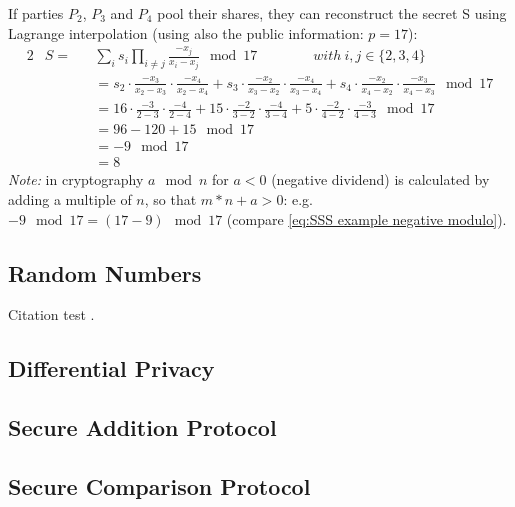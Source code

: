 		 If parties $P_2$, $P_3$ and $P_4$ pool their shares, they can reconstruct the secret S using Lagrange interpolation (using also the public information: $p=17$):
		 \begin{alignat}{2}
		 & S = && \sum_i s_i \prod_{i \neq j} \frac{-x_j}{x_i - x_j } \mod 17 \qquad \qquad  with \ i,j \in \{2,3,4\} \\
		 & \quad && =s_2 \cdot \frac{-x_3}{x_2-x_3} \cdot \frac{-x_4}{x_2-x_4} + s_3 \cdot \frac{-x_2}{x_3-x_2} \cdot \frac{-x_4}{x_3-x_4} + s_4 \cdot \frac{-x_2}{x_4-x_2} \cdot \frac{-x_3}{x_4-x_3} \mod 17 \nonumber \\
		 & \quad && =16 \cdot \frac{-3}{2-3} \cdot \frac{-4}{2-4} + 15 \cdot \frac{-2}{3-2} \cdot \frac{-4}{3-4} + 5 \cdot \frac{-2}{4-2} \cdot \frac{-3}{4-3} \mod 17  \nonumber \\
		 & \quad && = 96-120+15 \mod 17 \nonumber \\
		 & \quad && = -9 \mod 17 \label{eq:SSS example negative modulo} \\
		 & \quad && = 8 \nonumber 
		 \end{alignat}
		 \textit{Note:} in cryptography $a \mod n$ for $a<0$ (negative dividend) is calculated by adding a multiple of  $n$, so that $m*n+a>0$: e.g. $-9 \mod 17 = (17-9) \mod 17$ (compare \ref{eq:SSS example negative modulo}).
		 
		 
		 
		 
		 		
		\subsection*{Random Numbers}
		

		
		
		
		Citation test \autocite[pp. 35-37]{Cra:1}.

		\subsection*{Differential Privacy}
		
		\subsection*{Secure Addition Protocol}

		\subsection*{Secure Comparison Protocol}

